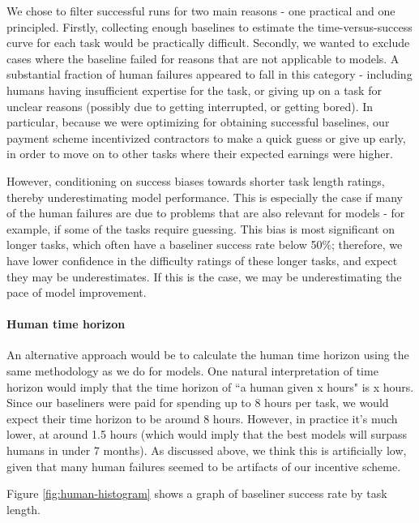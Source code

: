 \documentclass{article}
\begin{document}
We chose to filter successful runs for two main reasons - one practical and one principled. Firstly, collecting enough baselines to estimate the time-versus-success curve for each task would be practically difficult. Secondly, we wanted to exclude cases where the baseline failed for reasons that are not applicable to models. A substantial fraction of human failures appeared to fall in this category - including humans having insufficient expertise for the task, or giving up on a task for unclear reasons (possibly due to getting interrupted, or getting bored). In particular, because we were optimizing for obtaining successful baselines, our payment scheme incentivized contractors to make a quick guess or give up early, in order to move on to other tasks where their expected earnings were higher.

However, conditioning on success biases towards shorter task length ratings, thereby underestimating model performance. This is especially the case if many of the human failures are due to problems that are also relevant for models - for example, if some of the tasks require guessing. 
This bias is most significant on longer tasks, which often have a baseliner success rate below 50\%; therefore, we have lower confidence in the difficulty ratings of these longer tasks, and expect they may be underestimates. If this is the case, we may be underestimating the pace of model improvement. 

\paragraph{Human time horizon}
An alternative approach would be to calculate the human time horizon using the same methodology as we do for models. One natural interpretation of time horizon would imply that the time horizon of ``a human given x hours" is x hours. Since our baseliners were paid for spending up to 8 hours per task, we would expect their time horizon to be around 8 hours. However, in practice it's much lower, at around 1.5 hours (which would imply that the best models will surpass humans in under 7 months). As discussed above, we think this is artificially low, given that many human failures seemed to be artifacts of our incentive scheme.


Figure \ref{fig:human-histogram} shows a graph of baseliner success rate by task length. 
\end{document}
